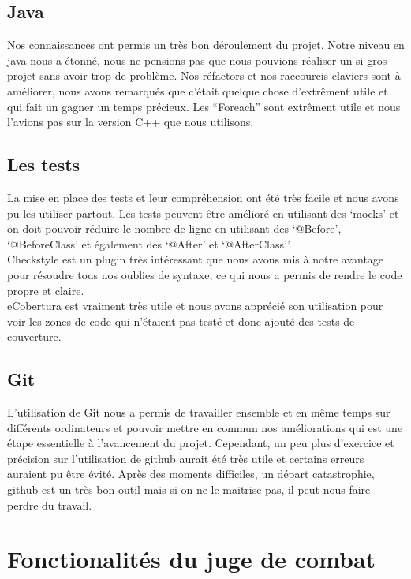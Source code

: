\documentclass[12pt]{article}
\begin{document}
\subsection{Java}

Nos connaissances ont permis un très bon déroulement du projet. Notre niveau en java nous a étonné, nous ne pensions pas que nous pouvions réaliser un si gros projet sans avoir trop de problème. Nos réfactors et nos raccourcis claviers sont à améliorer, nous avons remarqués que c'était quelque chose d'extrêment utile et qui fait un gagner un temps précieux. Les ``Foreach'' sont extrêment utile et nous l'avions pas sur la version C++ que nous utilisons. 

\subsection{Les tests}

La mise en place des tests et leur compréhension ont été très facile et nous avons pu les utiliser partout. Les tests peuvent être amélioré en utilisant des `mocks'  et on doit pouvoir réduire le nombre de ligne en utilisant des `@Before', `@BeforeClass' et également des `@After' et `@AfterClass''.\\
Checkstyle est un plugin très intéressant que nous avons mis à notre avantage pour résoudre tous nos oublies de syntaxe, ce qui nous a permis de rendre le code propre et claire.\\
eCobertura est vraiment très utile et nous avons apprécié son utilisation pour voir les zones de code qui n'étaient pas testé et donc ajouté des tests de couverture.

\subsection{Git}

L'utilisation de Git nous a permis de travailler ensemble et en même temps sur différents ordinateurs et pouvoir mettre en commun nos améliorations qui est une étape essentielle à l'avancement du projet. Cependant, un peu plus d'exercice et précision sur l'utilisation de github aurait été très utile et certains erreurs auraient pu être évité. Après des moments difficiles, un départ catastrophie, github est un très bon outil mais si on ne le maitrise pas, il peut nous faire perdre du travail.

\newpage
\section{Fonctionalités du juge de combat}
\end{document}
